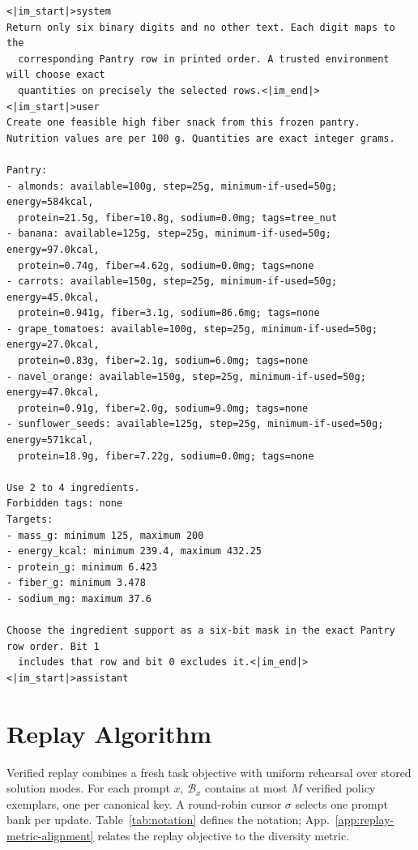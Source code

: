 \documentclass{article}
\newcommand{\1}{\mathbf 1}
\theoremstyle{remark}
\theoremstyle{definition}
\theoremstyle{plain}
\begin{document}
\begin{Verbatim}[fontsize=\scriptsize,frame=single,framesep=4pt,rulecolor=\color{black!25},samepage=false]
<|im_start|>system
Return only six binary digits and no other text. Each digit maps to the
  corresponding Pantry row in printed order. A trusted environment will choose exact
  quantities on precisely the selected rows.<|im_end|>
<|im_start|>user
Create one feasible high fiber snack from this frozen pantry.
Nutrition values are per 100 g. Quantities are exact integer grams.

Pantry:
- almonds: available=100g, step=25g, minimum-if-used=50g; energy=584kcal,
  protein=21.5g, fiber=10.8g, sodium=0.0mg; tags=tree_nut
- banana: available=125g, step=25g, minimum-if-used=50g; energy=97.0kcal,
  protein=0.74g, fiber=4.62g, sodium=0.0mg; tags=none
- carrots: available=150g, step=25g, minimum-if-used=50g; energy=45.0kcal,
  protein=0.941g, fiber=3.1g, sodium=86.6mg; tags=none
- grape_tomatoes: available=100g, step=25g, minimum-if-used=50g; energy=27.0kcal,
  protein=0.83g, fiber=2.1g, sodium=6.0mg; tags=none
- navel_orange: available=150g, step=25g, minimum-if-used=50g; energy=47.0kcal,
  protein=0.91g, fiber=2.0g, sodium=9.0mg; tags=none
- sunflower_seeds: available=125g, step=25g, minimum-if-used=50g; energy=571kcal,
  protein=18.9g, fiber=7.22g, sodium=0.0mg; tags=none

Use 2 to 4 ingredients.
Forbidden tags: none
Targets:
- mass_g: minimum 125, maximum 200
- energy_kcal: minimum 239.4, maximum 432.25
- protein_g: minimum 6.423
- fiber_g: minimum 3.478
- sodium_mg: maximum 37.6

Choose the ingredient support as a six-bit mask in the exact Pantry row order. Bit 1
  includes that row and bit 0 excludes it.<|im_end|>
<|im_start|>assistant
\end{Verbatim}



\section{Replay Algorithm}
\label{app:algorithm}

Verified replay combines a fresh task objective with uniform rehearsal over
stored solution modes. For each prompt $x$, $\mathcal B_x$ contains at most
$M$ verified policy exemplars, one per canonical key. A round-robin cursor
$\sigma$ selects one prompt bank per update. Table~\ref{tab:notation}
defines the notation; App.~\ref{app:replay-metric-alignment} relates the
replay objective to the diversity metric.
\end{document}
